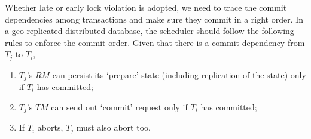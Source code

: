 \documentclass[conference]{IEEEtran}
\begin{document}






Whether late or early lock violation is adopted, we need to trace the commit dependencies among transactions and make sure they commit in a right order.
In a geo-replicated distributed database, the scheduler should follow the following rules to enforce the commit order.
Given that there is a commit dependency from ${T_j}$ to ${T_i}$,
\begin{enumerate}
  \item ${T_j}$'s $RM$ can persist its `prepare' state (including replication of the state) only if ${T_i}$ has committed;
  \label{rule:prepare}

  \item ${T_j}$'s $TM$ can send out `commit' request only if ${T_i}$ has committed;
  \label{rule:commit}

  \item If ${T_i}$ aborts, ${T_j}$ must also abort too.
  \label{rule:abort}
\end{enumerate}

\end{document}

